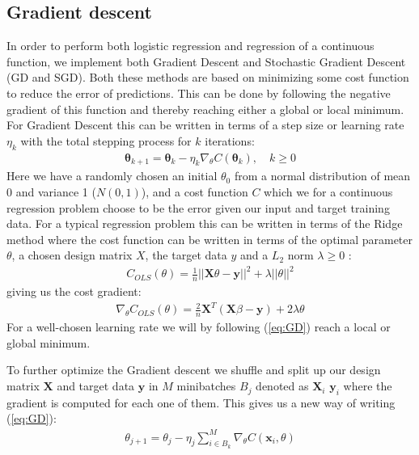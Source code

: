 \documentclass[11pt]{article}
\begin{document}
\subsection{Gradient descent}\label{sec:GD}
In order to perform both logistic regression and regression of a continuous function, we implement both Gradient Descent and Stochastic Gradient Descent (GD and SGD). Both these methods are based on minimizing some cost function to reduce the error of predictions. This can be done by following the negative gradient of this function and thereby reaching either a global or local minimum. For Gradient Descent this can be written in terms of a step size or learning rate $\eta_k$ with the total stepping process for $k$ iterations:
\begin{align}
    \label{eq:GD}
    \boldsymbol{\theta}_{k+1} = \boldsymbol{\theta}_k - \eta_k \nabla_\theta C(\boldsymbol{\theta}_k),\quad k \geq 0
\end{align}
Here we have a randomly chosen an initial $\theta_0$ from a normal distribution of mean 0 and variance 1 ($N(0,1)$), and a cost function $C$ which we for a continuous regression problem choose to be the error given our input and target training data. For a typical regression problem this can be written in terms of the Ridge method where the cost function can be written in terms of the optimal parameter $\theta$, a chosen design matrix $X$, the target data $y$ and a $L_2$ norm $\lambda \geq 0$ :
\begin{align*}
    C_{OLS}(\theta) = \frac{1 }{n }||\boldsymbol{X}\theta - \boldsymbol{y}||^2 + \lambda ||\theta||^2
\end{align*}
giving us the cost gradient:
\begin{align*}
    \nabla_\theta C_{OLS}(\theta) = \frac{2}{n}\boldsymbol{X}^T(\boldsymbol{X}\beta - \boldsymbol{y}) + 2\lambda \theta
\end{align*}
For a well-chosen learning rate we will by following (\ref{eq:GD}) reach a local or global minimum.

To further optimize the Gradient descent we shuffle and split up our design matrix $\boldsymbol{X}$ and target data $\boldsymbol{y}$ in $M$ minibatches $B_j$ denoted as $\boldsymbol{X}_i$ $\boldsymbol{y}_i$ where the gradient is computed for each one of them. This gives us a new way of writing (\ref{eq:GD}):
\begin{align}
    \label{eq:SGD}
    \theta_{j+1} = \theta_j - \eta_j \sum_{i\in B_k}^M \nabla_\theta C(\boldsymbol{x}_i, \theta)
\end{align}
\end{document}
